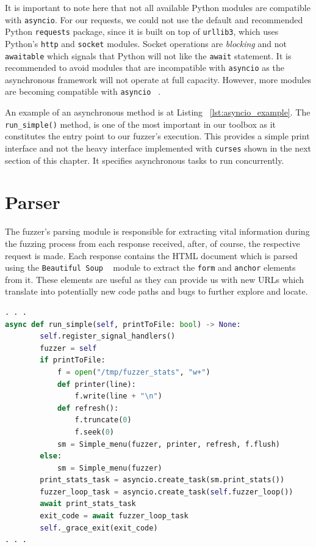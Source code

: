 It is important to note here that not all available Python modules are compatible with {\tt asyncio}. For our requests, we could not use the default and recommended Python {\tt requests} package, since it is built on top of {\tt urllib3}, which uses Python's {\tt http} and {\tt socket} modules. Socket operations are \emph{blocking} and not {\tt awaitable} which signals that Python will not like the {\tt await} statement. It is recommended to avoid modules that are incompatible with {\tt asyncio} as the asynchronous framework will not operate at full capacity. However, more modules are becoming compatible with {\tt asyncio} ~\cite{aiohttp}.

An example of an asynchronous method is at Listing ~\ref{lst:asyncio_example}. The {\tt run\_simple()} method, is one of the most important in our toolbox as it constitutes the entry point to our fuzzer's execution. This provides a simple print interface and not the heavy interface implemented with {\tt curses} shown in the next section of this chapter. It specifies asynchronous tasks to run concurrently.

\section{Parser}
The fuzzer's parsing module is responsible for extracting vital information during the fuzzing process from each response received, after, of course, the respective request is made. Each response contains the HTML document which is parsed using the {\tt Beautiful Soup} ~\cite{beautiful_soup} module to extract the {\tt form} and {\tt anchor} elements from it. These elements are useful as they can provide us with new URLs which translate into potentially new code paths and bugs to further explore and locate. 

\begin{lstlisting}[aboveskip=\baselineskip, showstringspaces=false, frame=single, language=Python, columns=flexible, keepspaces=true, caption={\textit{Starting point for the fuzzer's execution using a simple print interface}}, numberstyle=\color{gray}, numbersep=5pt, label={lst:asyncio_example}]
. . . 
async def run_simple(self, printToFile: bool) -> None:
        self.register_signal_handlers()
        fuzzer = self
        if printToFile:
            f = open("/tmp/fuzzer_stats", "w+")
            def printer(line):
                f.write(line + "\n")
            def refresh():
                f.truncate(0)
                f.seek(0)
            sm = Simple_menu(fuzzer, printer, refresh, f.flush)
        else:   
            sm = Simple_menu(fuzzer)
        print_stats_task = asyncio.create_task(sm.print_stats())
        fuzzer_loop_task = asyncio.create_task(self.fuzzer_loop())
        await print_stats_task
        exit_code = await fuzzer_loop_task
        self._grace_exit(exit_code)
. . .
     
\end{lstlisting}

